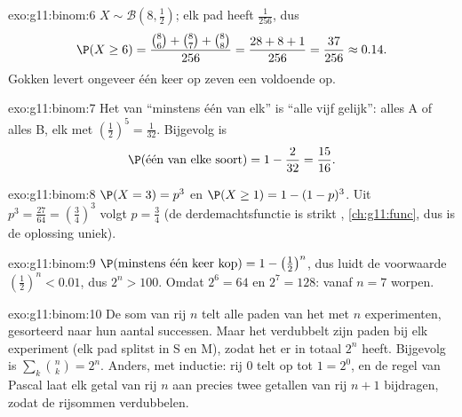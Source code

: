 \begin{solution}{exo:g11:binom:6}
$X \sim \mathcal B\left(8, \frac12\right)$; elk pad heeft 
$\frac{1}{256}$, dus
\[
\P(X \geq 6) = \frac{\binom86 + \binom87 + \binom88}{256}
= \frac{28 + 8 + 1}{256} = \frac{37}{256} \approx 0.14 .
\]
Gokken levert ongeveer één keer op zeven een voldoende op.
\end{solution}

\begin{solution}{exo:g11:binom:7}
Het  van ``minstens één van elk'' is ``alle vijf gelijk'': alles A
of alles B, elk met  $\left(\frac12\right)^5 = \frac1{32}$. Bijgevolg is
\[
\P(\text{één van elke soort}) = 1 - \frac{2}{32} = \frac{15}{16} .
\]
\end{solution}

\begin{solution}{exo:g11:binom:8}
$\P(X = 3) = p^3$ en $\P(X \geq 1) = 1 - (1-p)^3$. Uit
$p^3 = \frac{27}{64} = \left(\frac34\right)^3$ volgt $p = \frac34$ (de
derdemachtsfunctie is strikt , \cref{ch:g11:func}, dus is de
oplossing uniek).
\end{solution}

\begin{solution}{exo:g11:binom:9}
$\P(\text{minstens één keer kop}) = 1 - \left(\frac12\right)^n$, dus luidt de
voorwaarde $\left(\frac12\right)^n < 0.01$, dus $2^n > 100$. Omdat
$2^6 = 64$ en $2^7 = 128$: vanaf $n = 7$ worpen.
\end{solution}

\begin{solution}{exo:g11:binom:10}
De som van rij $n$ telt alle paden van het  met $n$ experimenten,
gesorteerd naar hun aantal successen. Maar het  verdubbelt zijn
paden bij elk experiment (elk pad splitst in S en M), zodat het er in totaal
$2^n$ heeft. Bijgevolg is $\sum_{k} \binom nk = 2^n$. Anders, met inductie:
rij $0$ telt op tot $1 = 2^0$, en de regel van Pascal laat elk getal van rij
$n$ aan precies twee getallen van rij $n+1$ bijdragen, zodat de rijsommen
verdubbelen.
\end{solution}


